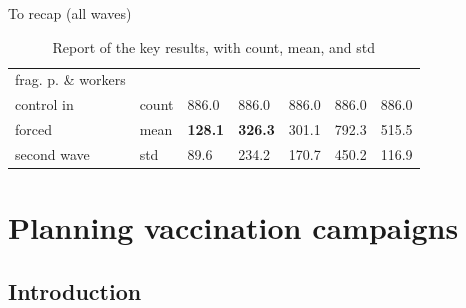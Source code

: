 \documentclass[9pt]{beamer}
\begin{document}
\begin{frame}{To recap (all waves)}
\begin{table}[H]
\begin{tabular}{p{1.8cm}p{0.5cm}p{0.5cm}p{0.5cm}p{0.5cm}p{0.5cm}p{0.5cm}}
\midrule
frag. p. \& workers \\  
control in              & count &   886.0 &                      886.0 &              886.0 &                   886.0 &  886.0 \\
forced                  & mean  &  \textbf{{\color{cyan}128.1}} &         \textbf{{\color{cyan}326.3}} &          301.1 &        792.3 &  515.5 \\
second wave       & std   &  89.6 &        234.2 &   170.7 &          450.2 &  116.9 \\


\bottomrule
\end{tabular}
\caption{Report of the key results, with count, mean, and std}
\label{keyResultsT}
\end{table}



\end{frame}

\section{Planning vaccination campaigns}

\subsection{Introduction}
\end{document}
